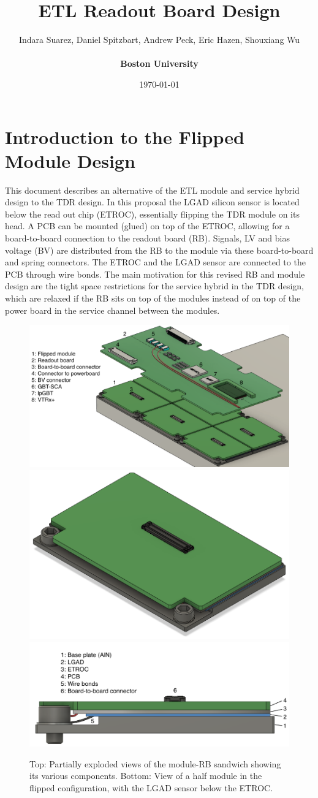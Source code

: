 \documentclass[11pt]{article}
\title{ETL Readout Board Design}
\author{Indara Suarez, Daniel Spitzbart, Andrew Peck, Eric Hazen, Shouxiang Wu
  \\
  \\ \Large{\textbf{Boston University}}}
\date{\today}
\begin{document}
\maketitle

\tableofcontents

\section{Introduction to the Flipped Module Design}

This document describes an alternative of the ETL module and service hybrid design to the TDR design.
In this proposal the LGAD silicon sensor is located below the read out chip (ETROC), essentially flipping the TDR module on its head.
A PCB can be mounted (glued) on top of the ETROC, allowing for a board-to-board connection to the readout board (RB).
Signals, LV and bias voltage (BV) are distributed from the RB to the module via these board-to-board and spring connectors.
The ETROC and the LGAD sensor are connected to the PCB through wire bonds.
The main motivation for this revised RB and module design are the tight space restrictions for the service hybrid in the TDR design, which are relaxed if the RB sits on top of the modules instead of on top of the power board in the service channel between the modules.

\begin{figure}[!h]
\centering
\includegraphics[width=0.90 \textwidth]{figures/ETL_exploded_legend.pdf}
\includegraphics[width=0.40 \textwidth]{figures/Flipped_module_3D_v2.png}
\includegraphics[width=0.55 \textwidth]{figures/Flipped_module_legend_v2.png}
\caption{
Top: Partially exploded views of the module-RB sandwich showing its various components.
Bottom: View of a half module in the flipped configuration, with the LGAD sensor below the ETROC.
}
\label{fig:flippedModule}
\end{figure}
\end{document}
